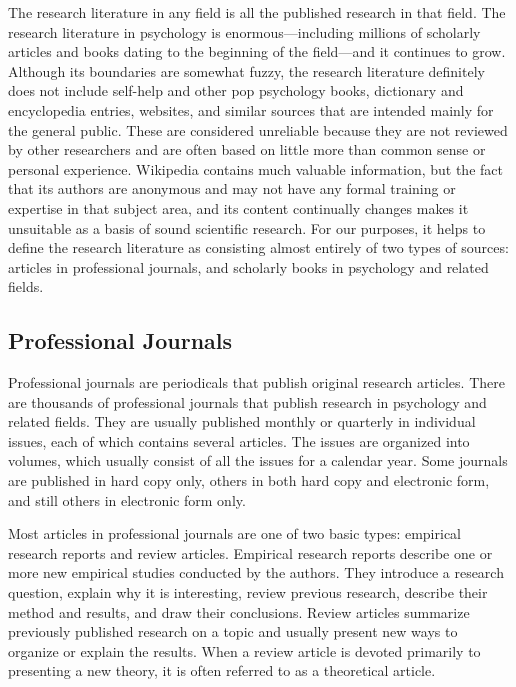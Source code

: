 The research literature in any field is all the published research in that field. The research literature in psychology is enormous---including millions of scholarly articles and books dating to the beginning of the field---and it continues to grow. Although its boundaries are somewhat fuzzy, the research literature definitely does not include self-help and other pop psychology books, dictionary and encyclopedia entries, websites, and similar sources that are intended mainly for the general public. These are considered unreliable because they are not reviewed by other researchers and are often based on little more than common sense or personal experience. Wikipedia contains much valuable information, but the fact that its authors are anonymous and may not have any formal training or expertise in that subject area, and its content continually changes makes it unsuitable as a basis of sound scientific research. For our purposes, it helps to define the research literature as consisting almost entirely of two types of sources: articles in professional journals, and scholarly books in psychology and related fields.

\subsection{Professional Journals}
Professional journals are periodicals that publish original research articles. There are thousands of professional journals that publish research in psychology and related fields. They are usually published monthly or quarterly in individual issues, each of which contains several articles. The issues are organized into volumes, which usually consist of all the issues for a calendar year. Some journals are published in hard copy only, others in both hard copy and electronic form, and still others in electronic form only.

Most articles in professional journals are one of two basic types: empirical research reports and review articles. Empirical research reports describe one or more new empirical studies conducted by the authors. They introduce a research question, explain why it is interesting, review previous research, describe their method and results, and draw their conclusions. Review articles summarize previously published research on a topic and usually present new ways to organize or explain the results. When a review article is devoted primarily to presenting a new theory, it is often referred to as a theoretical article.


